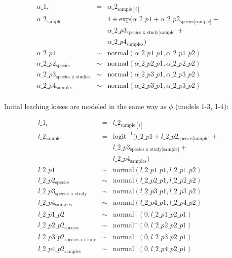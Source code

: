 \documentclass[
  12pt,
]{article}
\begin{document}
\begin{equation}
\begin{aligned}
\alpha\_1_i & = & \alpha\_2_{\text{sample}[i]}\\
\alpha\_2_{\text{sample}} & = & 1 + \text{exp}(\alpha\_2\_p1 + \alpha\_2\_p2_{\text{species[sample]}} + \\
                         && \alpha\_2\_p3_{\text{species x study[sample]}} + \\
                         && \alpha\_2\_p4_{\text{samples}})\\
\alpha\_2\_p1 & \sim & \text{normal}(\alpha\_2\_p1\_p1, \alpha\_2\_p1\_p2)\\
\alpha\_2\_p2_{\text{species}} & \sim & \text{normal}(\alpha\_2\_p2\_p1, \alpha\_2\_p2\_p2)\\
\alpha\_2\_p3_{\text{species x studies}} & \sim & \text{normal}(\alpha\_2\_p3\_p1, \alpha\_2\_p3\_p2)\\
\alpha\_2\_p4_{\text{samples}} & \sim & \text{normal}(\alpha\_2\_p3\_p1, \alpha\_2\_p3\_p2)\\
\label{eq:sup-model-6}
\end{aligned}
\end{equation}

Initial leaching losses are modeled in the same way as \(\phi\) (models 1-3, 1-4):

\begin{equation}
\begin{aligned}
l\_1_i & = & l\_2_{\text{sample}[i]}\\
l\_2_{\text{sample}} & = & \text{logit}^{-1}(l\_2\_p1 + l\_2\_p2_{\text{species[sample]}} + \\
                        && l\_2\_p3_{\text{species x study[sample]}} + \\                              && l\_2\_p4_{\text{samples}})\\
l\_2\_p1 & \sim & \text{normal}(l\_2\_p1\_p1, l\_2\_p1\_p2)\\
l\_2\_p2_{\text{species}} & \sim & \text{normal}(l\_2\_p2\_p1, l\_2\_p2\_p2)\\
l\_2\_p3_{\text{species x study}} & \sim & \text{normal}(l\_2\_p3\_p1, l\_2\_p3\_p2)\\
l\_2\_p4_{\text{samples}} & \sim & \text{normal}(l\_2\_p4\_p1, l\_2\_p4\_p2)\\
l\_2\_p1\_p2 & \sim & \text{normal}^+(0, l\_2\_p1\_p2\_p1)\\
l\_2\_p2\_p2_{\text{species}} & \sim & \text{normal}^+(0, l\_2\_p2\_p2\_p1)\\
l\_2\_p3\_p2_{\text{species x study}} & \sim & \text{normal}^+(0, l\_2\_p3\_p2\_p1)\\
l\_2\_p4\_p2_{\text{samples}} & \sim & \text{normal}^+(0, l\_2\_p4\_p2\_p1)\\
\label{eq:sup-model-7}
\end{aligned}
\end{equation}
\end{document}
